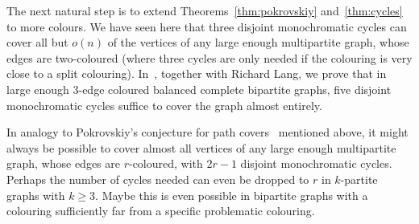 \documentclass[a4paper,10pt]{article}
\begin{document}
\medskip

The next natural step is to extend Theorems~\ref{thm:pokrovskiy} and~\ref{thm:cycles} to more colours. We have seen here that three disjoint monochromatic cycles can cover all but $o(n)$ of the vertices of any large enough multipartite graph, whose edges are two-coloured (where three cycles are only needed if the colouring is very close to a split colouring). 
In~\cite{LSS14}, together with Richard Lang, we prove that in  large enough  3-edge coloured balanced complete bipartite graphs,  five disjoint monochromatic  cycles suffice to cover the graph almost entirely. 

In analogy to Pokrovskiy's conjecture for path covers~\cite{Pok14} mentioned above, it might always be possible to cover almost all vertices of any large enough multipartite graph, whose edges are $r$-coloured, with $2r-1$ disjoint monochromatic cycles. Perhaps the number of cycles needed can even be dropped to  $r$ in $k$-partite graphs with $k\geq 3$.
Maybe this is even possible in bipartite graphs with a colouring sufficiently far from a specific problematic colouring.




 
 
 
 
 
\end{document}

